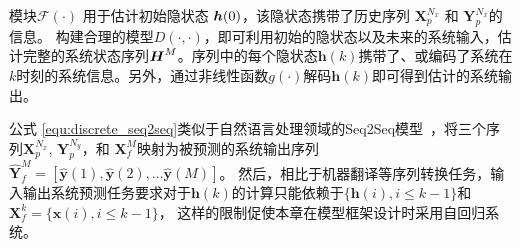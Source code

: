 模块$\mathcal{F}(\cdot)$ 用于估计初始隐状态 $\boldsymbol h(0)$，该隐状态携带了历史序列 $\boldsymbol X_p^{N_x} \text{ 和 } \boldsymbol Y_p^{N_x}$的信息。
构建合理的模型$D(\cdot, \cdot)$，即可利用初始的隐状态以及未来的系统输入，估计完整的系统状态序列$\boldsymbol H^M$。序列中的每个隐状态$\boldsymbol h(k)$携带了、或编码了系统在$k$时刻的系统信息。另外，通过非线性函数$g(\cdot)$解码$\boldsymbol h(k)$即可得到估计的系统输出。

公式 \eqref{equ:discrete_seq2seq}类似于自然语言处理领域的Seq2Seq模型~\cite{Weiss2017Sequence}，将三个序列$\boldsymbol X_p^{N_x}$, $\boldsymbol{Y}_p^{N_y}$，和 $\boldsymbol {X}_f^{M}$映射为被预测的系统输出序列$\hat {\boldsymbol {Y}}_f^{M}=[\hat{\boldsymbol {y}}(1),\hat{\boldsymbol y}(2),...\hat{\boldsymbol y}(M)]$。
然后，相比于机器翻译等序列转换任务，输入输出系统预测任务要求对于$\boldsymbol{h}(k)$的计算只能依赖于$\{\boldsymbol h(i), i\leq k-1\}$和$\boldsymbol{X}_{f}^{k}=\{\boldsymbol x(i), i\leq k-1\}$，
这样的限制促使本章在模型框架设计时采用自回归系统。


